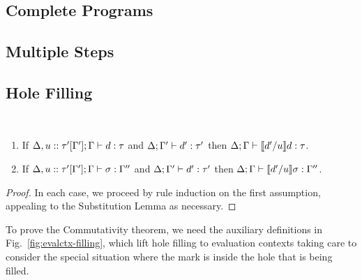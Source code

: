 

\subsection{Complete Programs}
\label{sec:complete-programs}



\subsection{Multiple Steps}
\label{sec:multi-step}



\subsection{Hole Filling}\label{sec:hole-filling}
\begin{lem}[Filling] ~
  \begin{enumerate}[nolistsep]
  \item If $\Delta, u :: \tau'[\Gamma']; \Gamma \vdash d : \tau$
  and $\Delta; \Gamma' \vdash d' : \tau'$
  then $\Delta; \Gamma \vdash \llbracket d' / u\rrbracket d : \tau$.
  \item If $\Delta, u :: \tau'[\Gamma']; \Gamma \vdash \sigma : \Gamma''$
  and $\Delta; \Gamma' \vdash d' : \tau'$
  then $\Delta; \Gamma \vdash \llbracket d' / u\rrbracket \sigma : \Gamma''$.
  \end{enumerate}
\end{lem}
\begin{proof}
In each case, we proceed by rule induction on the first assumption, appealing to the Substitution Lemma as necessary.
\end{proof}

To prove the Commutativity theorem, we need the auxiliary definitions in Fig.~\ref{fig:evalctx-filling}, which lift hole filling to evaluation contexts taking care to consider the special situation where the mark is inside the hole that is being filled.


